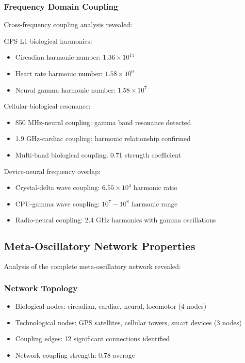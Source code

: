 \documentclass[12pt]{article}
\begin{document}
\subsubsection{Frequency Domain Coupling}

Cross-frequency coupling analysis revealed:

GPS L1-biological harmonics:
\begin{itemize}
\item Circadian harmonic number: $1.36 \times 10^{14}$
\item Heart rate harmonic number: $1.58 \times 10^{9}$
\item Neural gamma harmonic number: $1.58 \times 10^{7}$
\end{itemize}

Cellular-biological resonance:
\begin{itemize}
\item 850 MHz-neural coupling: gamma band resonance detected
\item 1.9 GHz-cardiac coupling: harmonic relationship confirmed
\item Multi-band biological coupling: 0.71 strength coefficient
\end{itemize}

Device-neural frequency overlap:
\begin{itemize}
\item Crystal-delta wave coupling: $6.55 \times 10^{4}$ harmonic ratio
\item CPU-gamma wave coupling: $10^{7} - 10^{8}$ harmonic range  
\item Radio-neural coupling: 2.4 GHz harmonics with gamma oscillations
\end{itemize}

\subsection{Meta-Oscillatory Network Properties}

Analysis of the complete meta-oscillatory network revealed:

\subsubsection{Network Topology}
\begin{itemize}
\item Biological nodes: circadian, cardiac, neural, locomotor (4 nodes)
\item Technological nodes: GPS satellites, cellular towers, smart devices (3 nodes)
\item Coupling edges: 12 significant connections identified
\item Network coupling strength: 0.78 average
\end{itemize}
\end{document}
